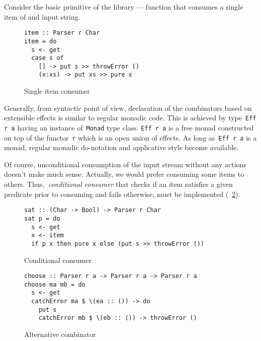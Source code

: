       Consider the basic primitive of the library --- function that consumes
      a single item of and input string.

      \begin{figure}[h]
      \begin{lstlisting}
item :: Parser r Char
item = do
  s <- get
  case s of
    [] -> put s >> throwError ()
    (x:xs) -> put xs >> pure x
      \end{lstlisting}
      \caption{Single item consumer}
      \label{listing:ExtEffParsersItem}
      \end{figure}

      Generally, from syntactic point of view, declaration of the combinators based on
      extensible effects is similar to regular monadic code. This is achieved by
      type~\texttt{Eff r a} having an instance of~\texttt{Monad} type class.
      \texttt{Eff r a} is a free monad constructed on top of the functor~\texttt{r}
      which is an open union of effects. As long as~\texttt{Eff r a} is a monad,
      regular monadic do-notation and applicative style become available.

      Of course, unconditional consumption of the input stream without any actions
      doesn't make much sense. Actually, we would prefer consuming some items to others. Thus,~\emph{conditional consumer} that checks if an item satisfies a
      given predicate prior to consuming and fails otherwise, must be
      implemented (~\ref{listing:ExtEffParsersSat}).

      \begin{figure}[h]
      \begin{lstlisting}
sat :: (Char -> Bool) -> Parser r Char
sat p = do
  s <- get
  x <- item
  if p x then pure x else (put s >> throwError ())
      \end{lstlisting}
      \caption{Conditional consumer}
      \label{listing:ExtEffParsersSat}
      \end{figure}

      \begin{figure}[h]
      \begin{lstlisting}
choose :: Parser r a -> Parser r a -> Parser r a
choose ma mb = do
  s <- get
  catchError ma $ \(ea :: ()) -> do
    put s
    catchError mb $ \(eb :: ()) -> throwError ()
      \end{lstlisting}
      \caption{Alternative combinator}
      \label{listing:ExtEffParsersChoose}
      \end{figure}

